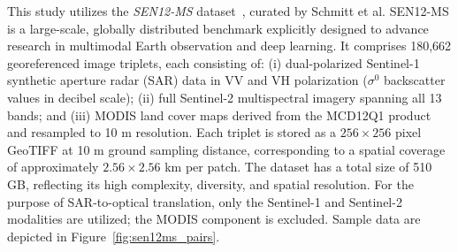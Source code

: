 This study utilizes the \textit{SEN12-MS} dataset~\cite{sen12ms_2019}, curated by Schmitt et al. SEN12-MS is a large-scale, globally distributed benchmark explicitly designed to advance research in multimodal Earth observation and deep learning. It comprises 180,662 georeferenced image triplets, each consisting of: (i) dual-polarized Sentinel-1 synthetic aperture radar (SAR) data in VV and VH polarization ($\sigma^{0}$ backscatter values in decibel scale); (ii) full Sentinel-2 multispectral imagery spanning all 13 bands; and (iii) MODIS land cover maps derived from the MCD12Q1 product and resampled to 10 m resolution. Each triplet is stored as a $256 \times 256$ pixel GeoTIFF at 10 m ground sampling distance, corresponding to a spatial coverage of approximately $2.56 \times 2.56$ km per patch. The dataset has a total size of 510 GB, reflecting its high complexity, diversity, and spatial resolution. For the purpose of SAR-to-optical translation, only the Sentinel-1 and Sentinel-2 modalities are utilized; the MODIS component is excluded. Sample data are depicted in Figure~\ref{fig:sen12ms_pairs}.

